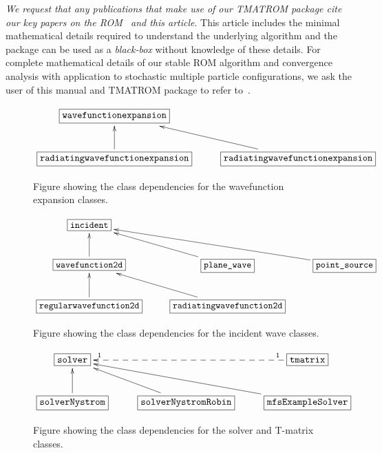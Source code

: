 \documentclass[12pt,letterpaper,final]{article}
\begin{document}
{\em We request that any publications that make use of our TMATROM package cite 
our key papers on the ROM~\cite{gh:tmat2d, gh:stoc_mult, ghh:tmatrix} and this article}.
This article includes the minimal mathematical details required to understand
the underlying algorithm and the package can be used as a {\em black-box}
without knowledge of these details. For complete mathematical details of our stable ROM algorithm
and convergence analysis with application to stochastic multiple particle configurations,
we ask the user of this manual and TMATROM package to refer to~\cite{ghh:tmatrix}.


\begin{figure}[!ht]
\centering
\begin{displaymath}
\xymatrix{ \fbox{\texttt{wavefunctionexpansion}} & \\
\fbox{\texttt{radiatingwavefunctionexpansion}}\ar@/0ex/[u] &  \fbox{\texttt{radiatingwavefunctionexpansion}}\ar@/0ex/[ul]
}
\end{displaymath}
\caption{\label{fig:wavefunctions}
Figure showing the class dependencies for the wavefunction expansion classes.}
\end{figure}

\begin{figure}[!ht]
\centering
\begin{displaymath}
\xymatrix{ \fbox{\texttt{incident}} & & \\
\fbox{\texttt{wavefunction2d}}\ar@/0ex/[u] & \fbox{\texttt{plane\_wave}}\ar@/0ex/[ul] & \fbox{\texttt{point\_source}}\ar@/0ex/[ull] \\
\fbox{\texttt{regularwavefunction2d}}\ar@/0ex/[u] & \fbox{\texttt{radiatingwavefunction2d}}\ar@/0ex/[ul]
}
\end{displaymath}
\caption{\label{fig:incidents}
Figure showing the class dependencies for the incident wave classes.}
\end{figure}

\begin{figure}[!ht]
\centering
\begin{displaymath}
\xymatrix{ 
\fbox{\texttt{solver}} & & \fbox{\texttt{tmatrix}}\ar@{-->}[ll]_<<<1_>>>1 \\
\fbox{\texttt{solverNystrom}}\ar@/0ex/[u] & \fbox{\texttt{solverNystromRobin}}\ar@/0ex/[ul] & \fbox{\texttt{mfsExampleSolver}}\ar@/0ex/[ull] 
}
\end{displaymath}
\caption{\label{fig:solvers}
Figure showing the class dependencies for the solver and T-matrix classes.}
\end{figure}
\end{document}
